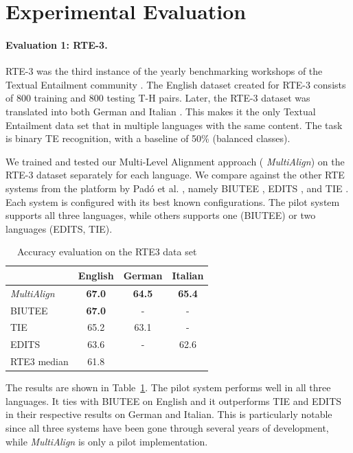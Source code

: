 \documentclass[11pt,letterpaper]{article}
\begin{document}
\section{Experimental Evaluation} 
 
\paragraph{Evaluation 1: RTE-3.}
RTE-3 was the third instance of the yearly benchmarking workshops of
the Textual Entailment community
\cite{giampiccolo07:_third_pascal_recog_textual_entail_chall}. The
English dataset created for RTE-3 consists of 800 training and 800
testing T-H pairs. Later, the RTE-3 dataset was translated into both
German and Italian \cite{Magnini:2014}. This makes it the only Textual 
Entailment data set that in multiple languages with the same
content. The task is binary TE recognition, with a baseline of 50\%
(balanced classes).

We trained and tested our Multi-Level Alignment approach ({\em
  MultiAlign}) on the RTE-3 dataset separately for each language. We
compare against the other RTE systems from the platform by Pad\'o et
al. , namely BIUTEE \cite{Stern:2012}, EDITS
\cite{Kouylekov:2010}, and TIE \cite{Wang:2009}. Each system is
configured with its best known configurations. The pilot system
supports all three languages, while others supports one (BIUTEE) or
two languages (EDITS, TIE).

\begin{table}[t!]
\centering
\small
\begin{tabular}{l|ccc}
          &   English   &   German   &   Italian \\
\hline
{\em MultiAlign}&   \textbf{67.0}      &   \textbf{64.5}    &  \textbf{65.4}  \\
BIUTEE        &   \textbf{67.0}      &     -       &     -    \\
TIE           &   65.2       &   63.1    &     -    \\ 
EDITS         &   63.6      &     -       &  62.6  \\ \hline
RTE3 median   &   61.8      &             &          \\

\end{tabular}
\caption{Accuracy evaluation on the RTE3 data set}
\label{table:rte3}
\end{table}

The results are shown in Table~\ref{table:rte3}. The pilot system
performs well in all three languages. It ties with BIUTEE on English
and it outperforms TIE and EDITS in their respective results on German
and Italian. This is particularly notable since all three systems have
been gone through several years of development, while
{\em MultiAlign} is only a pilot implementation.
\end{document}
